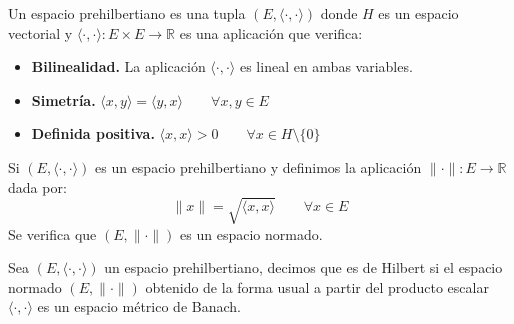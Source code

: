 \begin{definicion}
    Un espacio prehilbertiano es una tupla $(E,\langle \cdot,\cdot   \rangle )$ donde $H$ es un espacio vectorial y $\langle \cdot ,\cdot  \rangle:E\times E\to \mathbb{R} $ es una aplicación que verifica:
    \begin{itemize}
        \item \textbf{Bilinealidad.} La aplicación $\langle \cdot ,\cdot  \rangle $ es lineal en ambas variables.
        \item \textbf{Simetría.} $\langle x,y \rangle  = \langle y,x \rangle \qquad \forall x,y\in E$
        \item \textbf{Definida positiva.} $\langle x,x \rangle >0 \qquad \forall x\in H\setminus \{0\}$
    \end{itemize}
\end{definicion}

\begin{prop}
    Si $(E, \langle \cdot ,\cdot  \rangle )$ es un espacio prehilbertiano y definimos la aplicación $\|\cdot \|:E\to \mathbb{R}$ dada por:
    \begin{equation*}
        \|x\| = \sqrt{\langle x,x \rangle } \qquad \forall x\in E
    \end{equation*}
    Se verifica que $(E,\|\cdot \|)$ es un espacio normado.
\end{prop}

\begin{definicion}
    Sea $(E,\langle \cdot ,\cdot  \rangle )$ un espacio prehilbertiano, decimos que es de Hilbert si el espacio normado $(E,\|\cdot \|)$ obtenido de la forma usual a partir del producto escalar $\langle \cdot ,\cdot  \rangle $ es un espacio métrico de Banach.
\end{definicion}

